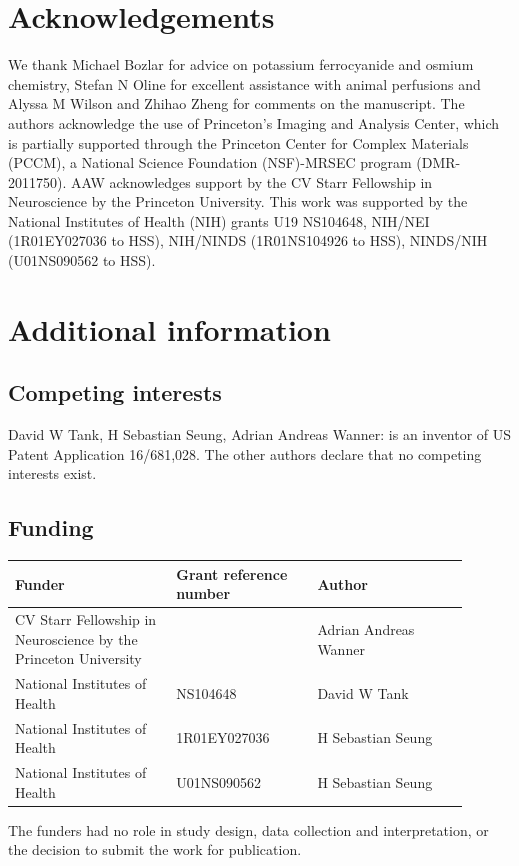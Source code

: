 \documentclass{article}
\begin{document}
\section*{Acknowledgements}
We thank Michael Bozlar for advice on potassium ferrocyanide and osmium chemistry, Stefan N Oline for excellent assistance with animal perfusions and Alyssa M Wilson and Zhihao Zheng for comments on the manuscript. The authors acknowledge the use of Princeton’s Imaging and Analysis Center, which is partially supported through the Princeton Center for Complex Materials (PCCM), a National Science Foundation (NSF)-MRSEC program (DMR-2011750). AAW acknowledges support by the CV Starr Fellowship in Neuroscience by the Princeton University. This work was supported by the National Institutes of Health (NIH) grants U19 NS104648, NIH/NEI (1R01EY027036 to HSS), NIH/NINDS (1R01NS104926 to HSS), NINDS/NIH (U01NS090562 to HSS).

\section*{Additional information}
\subsection*{Competing interests}
David W Tank, H Sebastian Seung, Adrian Andreas Wanner: is an inventor of US Patent Application 16/681,028. The other authors declare that no competing interests exist.

\subsection*{Funding}
\noindent\begin{tabular}{p{0.32\linewidth}p{0.28\linewidth}p{0.3\linewidth}}
\toprule
Funder & Grant reference number & Author\\
\midrule
CV Starr Fellowship in Neuroscience by the Princeton University & & Adrian Andreas Wanner\\
\midrule
National Institutes of Health & NS104648 & David W Tank\\
\midrule
National Institutes of Health & 1R01EY027036 & H Sebastian Seung\\
\midrule
National Institutes of Health & U01NS090562 & H Sebastian Seung\\
\bottomrule
\end{tabular}

\noindent The funders had no role in study design, data collection and interpretation, or the decision to submit the work for publication.
\end{document}
